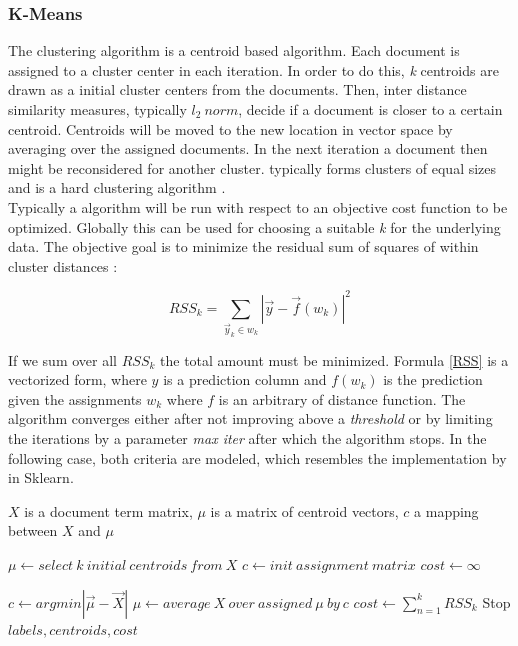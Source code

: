     \subsubsection{K-Means}
    \label{sec:k_means}

    The \kmeans{} clustering algorithm is a centroid based algorithm. Each document is assigned to a cluster center in each iteration. In order to do this, \emph{k} centroids are drawn as a initial cluster centers from the documents. Then, inter distance similarity measures, typically $l_2\:norm$, decide if a document is closer to a certain centroid. Centroids will be moved to the new location in vector space by averaging over the assigned documents. In the next iteration a document then might be reconsidered for another cluster. \kmeans{} typically forms clusters of equal sizes and is a hard clustering algorithm \cite{IRBookStanford2008}.\\
    Typically a \kmeans{} algorithm will be run with respect to an objective cost function to be optimized. Globally this can be used for choosing a suitable \emph{k} for the underlying data. The objective goal is to minimize the residual sum of squares of within cluster distances \cite{IRBookStanford2008}:

      \begin{equation}
        RSS_k = \sum_{\vec{y}_k \in \textit{w}_k}|\vec{y} - \vec{f}(\textit{w}_k)|^{2}
        \label{RSS}
      \end{equation}

    If we sum over all $RSS_k$ the total amount must be minimized. Formula \ref{RSS} is a vectorized form, where $y$ is a prediction column and $f(w_k)$ is the prediction given the assignments $w_k$ where $f$ is an arbitrary of distance function. The algorithm converges either after not improving above a \emph{threshold} or by limiting the iterations by a parameter \emph{max iter} after which the algorithm stops. In the following case, both criteria are modeled, which resembles the implementation by \cite{ScikitLearn} in Sklearn.

    \begin{algorithm}[H]
    \begin{algorithmic}[1]
      \caption{$X$ is a document term matrix, $\mu$ is a matrix of centroid vectors, $c$ a mapping between $X$ and $\mu$}\label{kmeans}
        \State $\mu \gets select\:k\:initial\:centroids\:from\:X$
        \State $c \gets init\:assignment\:matrix {}$
        \State $cost \gets \infty$

          \State $c \gets argmin|\vec{\mu} - \vec{X}|$ 
          \State $\mu \gets average\:X\:over\:assigned\:\mu\:by\:c$
          \State $cost \gets \sum_{n = 1}^{k}RSS_k$
            \State Stop
          \EndIf
        \EndFor
        \State \Return $labels, centroids, cost$
      \EndFunction
    \end{algorithmic}
    \end{algorithm}

